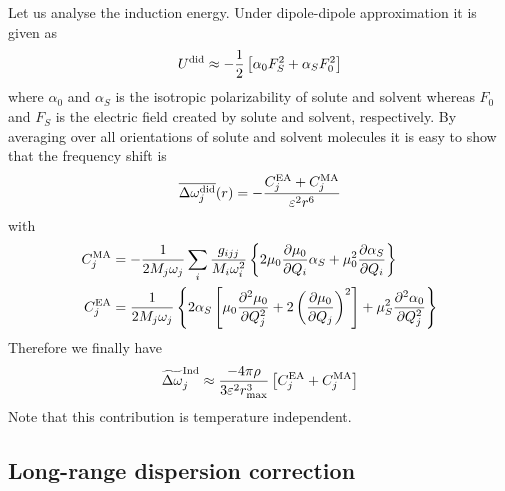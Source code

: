 \documentclass[a4paper,titlepage,twoside,fleqn,12pt]{book}
\newcommand{\fderiv}[2]{\ensuremath{
    \frac{\partial #1}{\partial #2}}}
\newcommand{\sderiv}[2]{\ensuremath{
    \frac{\partial^2 #1}{\partial #2^2}
    }}
\begin{document}
\begin{refsection}
Let us analyse the induction energy. Under dipole\hyp{}dipole
approximation it is given as
%
\begin{equation}
 U^{\rm did} \approx -\frac{1}{2} \left[ \alpha_0 F_S^2 + \alpha_S F_0^2\right]
\end{equation}
%
where $\alpha_0$ and $\alpha_S$ is the isotropic polarizability
of solute and solvent whereas $F_0$ and $F_S$ is the electric field
created by solute and solvent, respectively.
By averaging over all orientations of solute and solvent
molecules it is easy to show that
the frequency shift is
%
\begin{equation}
 \overline{\Delta \omega_j^{\rm did}}(r) = 
-\frac{C_j^{\rm EA} + C_j^{\rm MA} }{\varepsilon^2 r^6}
\end{equation}
%
with
%
\begin{subequations}
\begin{align}
  C_j^{\rm MA} &= -\frac{1}{2M_j\omega_j}\sum_i \frac{g_{ijj}}{M_i\omega_i^2} \left\{ 
   2\mu_0\fderiv{\mu_0}{Q_i}\alpha_S + \mu_0^2\fderiv{\alpha_S}{Q_i}
\right\} \\
  C_j^{\rm EA} &= \frac{1}{2M_j\omega_j} \left\{ 
  2\alpha_S\left[
      \mu_0\sderiv{\mu_0}{Q_j} + 2\left(\fderiv{\mu_0}{Q_j}\right)^2 
    \right]
   + \mu_S^2 \sderiv{\alpha_0}{Q_j}
\right\}
\end{align}
\end{subequations}
%
Therefore we finally have
%
\begin{equation} \label{e:x12341}
 \widetilde{\Delta \omega}_j^{\rm Ind} \approx
\frac{-4\pi\rho}{3\varepsilon^2 r_{\max}^3} \left[ C_j^{\rm EA} + C_j^{\rm MA} \right]
\end{equation}
%
Note that this contribution is temperature independent.

\subsection{Long\hyp{}range dispersion correction}


\end{refsection}
\end{document}
